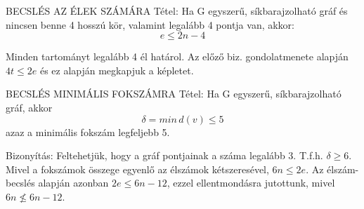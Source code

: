 \documentclass[]{article}
\begin{document}
\begin{framed}
BECSLÉS AZ ÉLEK SZÁMÁRA Tétel: Ha G egyszerű, síkbarajzolható gráf és nincsen benne 4 hosszú kör, valamint legalább 4 pontja van, akkor:
$$e \leq 2n - 4$$
\end{framed}
\begin{leftbar}
Minden tartományt legalább 4 él határol. Az előző biz. gondolatmenete alapján $4t \leq 2e$ és ez alapján megkapjuk a képletet.
\end{leftbar}
\begin{framed}
BECSLÉS MINIMÁLIS FOKSZÁMRA Tétel: Ha G egyszerű, síkbarajzolható gráf, akkor $$\delta = min\, d(v) \leq 5$$ azaz a minimális fokszám legfeljebb 5.
\end{framed}
\begin{leftbar}
Bizonyítás: Feltehetjük, hogy a gráf pontjainak a száma legalább 3. T.f.h. $\delta \geq 6$. Mivel a fokszámok összege egyenlő az élszámok kétszeresével, $6n \leq 2e$. Az élszám-becslés alapján azonban $2e \leq 6n - 12$, ezzel ellentmondásra jutottunk, mivel $6n \not\leq 6n - 12$.
\end{leftbar}
\end{document}
